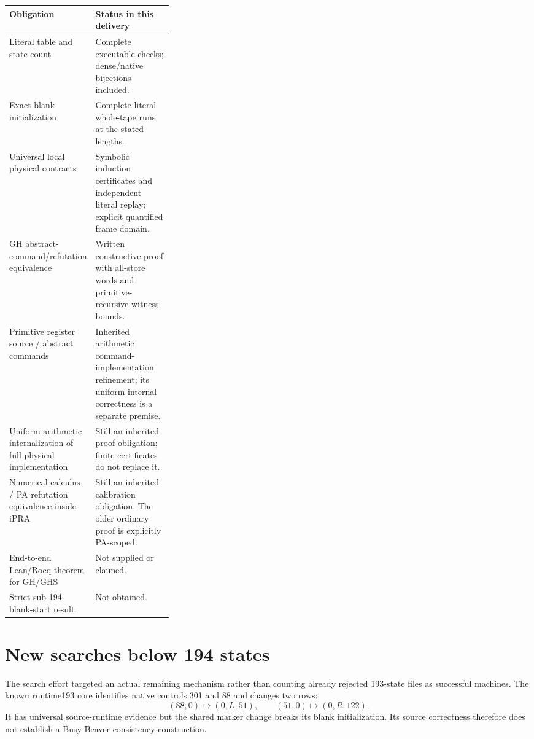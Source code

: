 \documentclass[11pt,letterpaper]{article}
\begin{document}
\begin{center}\small
\begin{tabularx}{\linewidth}{@{}p{0.31\linewidth}X@{}}
\toprule
Obligation & Status in this delivery\\
\midrule
Literal table and state count & Complete executable checks; dense/native bijections included.\\
Exact blank initialization & Complete literal whole-tape runs at the stated lengths.\\
Universal local physical contracts & Symbolic induction certificates and independent literal replay; explicit quantified frame domain.\\
GH abstract-command/refutation equivalence & Written constructive proof with all-store words and primitive-recursive witness bounds.\\
Primitive register source / abstract commands & Inherited arithmetic command-implementation refinement; its uniform internal correctness is a separate premise.\\
Uniform arithmetic internalization of full physical implementation & Still an inherited proof obligation; finite certificates do not replace it.\\
Numerical calculus / PA refutation equivalence inside iPRA & Still an inherited calibration obligation. The older ordinary proof is explicitly PA-scoped.\\
End-to-end Lean/Rocq theorem for GH/GHS & Not supplied or claimed.\\
Strict sub-194 blank-start result & Not obtained.\\
\bottomrule
\end{tabularx}
\end{center}

\section{New searches below 194 states}
\label{sec:search}

The search effort targeted an actual remaining mechanism rather than
counting already rejected 193-state files as successful machines. The
known runtime193 core identifies native controls 301 and 88 and changes
two rows:
\[
  (88,0)\mapsto(0,L,51),\qquad(51,0)\mapsto(0,R,122).
\]
It has universal source-runtime evidence but the shared marker change
breaks its blank initialization. Its source correctness therefore does
not establish a Busy Beaver consistency construction.


\end{document}
